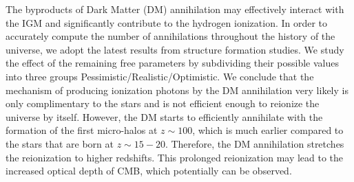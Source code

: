 The byproducts of Dark Matter (DM) annihilation may effectively interact with the IGM and significantly contribute to the hydrogen ionization. In order to accurately compute the number of annihilations throughout the history of the universe, we adopt the latest results from structure formation studies. We study the effect of the remaining free parameters by subdividing their possible values into three groups Pessimistic/Realistic/Optimistic. We conclude that the mechanism of producing ionization photons by the DM annihilation very likely is only complimentary to the stars and is not efficient enough to reionize the universe by itself. However, the DM starts to efficiently annihilate with the formation of the first micro-halos at $z\sim100$, which is much earlier compared to the stars that are born at $z\sim15-20$. Therefore, the DM annihilation stretches the reionization to higher redshifts. This prolonged reionization may lead to the increased optical depth of CMB, which potentially can be observed.